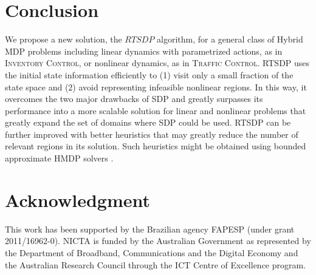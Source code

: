 \documentclass[letterpaper]{article}
\newcommand{\Invent}{\textsc{Inventory Control}}
\newcommand{\Traffic}{\textsc{Traffic Control}}
\begin{document}
\section{Conclusion}
We propose a new solution, the $RTSDP$ algorithm, for a general class of Hybrid MDP problems including linear dynamics with parametrized actions, as in \Invent, or nonlinear dynamics, as in \Traffic.
RTSDP uses the initial state information efficiently to (1) visit only a small fraction of the state space and (2) avoid representing infeasible nonlinear regions. In this way, it overcomes the two major drawbacks of SDP and greatly surpasses its performance into a more scalable solution for linear and nonlinear problems that greatly expand the set of domains where SDP could be used.
RTSDP can be further improved with better heuristics that may greatly reduce the  number of relevant regions in its solution. 
Such heuristics might be obtained using bounded approximate HMDP solvers \cite{vianna13}.

\section*{Acknowledgment}
This work has been supported by the Brazilian agency FAPESP (under 
 grant 2011/16962-0). NICTA is funded by the
 Australian Government as represented by
the Department of Broadband, Communications and the Digital
Economy and the Australian Research Council through the ICT
Centre of Excellence program.



\end{document}
